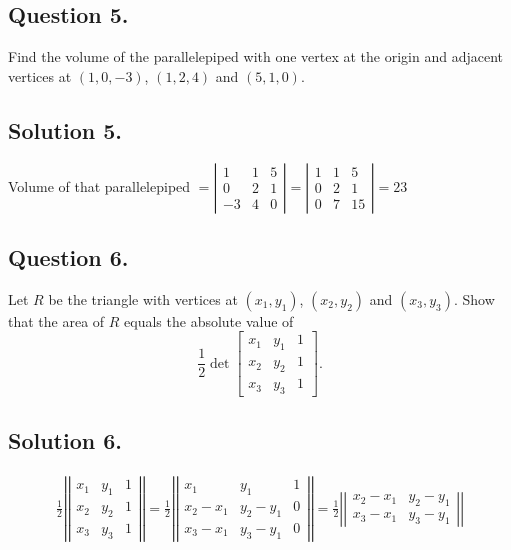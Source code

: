 \documentclass{article}
\begin{document}
\subsection*{Question 5.}
Find the volume of the parallelepiped with one vertex at the origin and adjacent vertices at $(1,0,-3)$, $(1,2,4)$ and $(5,1,0)$.
\subsection*{Solution 5.}
Volume of that parallelepiped
$=\left\vert\begin{array}{rrr} 1 & 1 & 5 \\ 0 & 2 & 1 \\ -3 & 4 & 0 \end{array}\right\vert=\left\vert\begin{array}{rrr} 1 & 1 & 5 \\ 0 & 2 & 1 \\ 0 & 7 & 15 \end{array}\right\vert=23$
\subsection*{Question 6.}
Let $R$ be the triangle with vertices at $(x_1,y_1)$, $(x_2,y_2)$ and $(x_3,y_3)$. Show that the area of $R$ equals the absolute value of 
\[\frac{1}{2}\det \left[\begin{array}{lll}
x_1 & y_1 & 1 \\ x_2 & y_2 & 1 \\ x_3 & y_3 & 1
\end{array}\right].\]
\subsection*{Solution 6.}\begin{align}
    \frac{1}{2}\left\vert\left\vert\begin{array}{lll}
x_1 & y_1 & 1 \\ x_2 & y_2 & 1 \\ x_3 & y_3 & 1
\end{array}\right\vert\right\vert=\frac{1}{2}\left\vert\left\vert\begin{array}{ccc}
x_1 & y_1 & 1 \\ x_2-x_1 & y_2-y_1 & 0 \\ x_3-x_1 & y_3-y_1 & 0
\end{array}\right\vert\right\vert=\frac{1}{2}\left\vert\left\vert\begin{array}{rr}
x_2-x_1 & y_2-y_1 \\
x_3-x_1 & y_3-y_1
\end{array}\right\vert\right\vert
\end{align}
\end{document}
